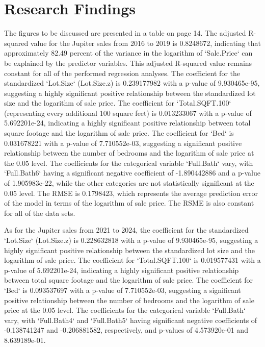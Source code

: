 \documentclass[12pt,english]{article}
\begin{document}
\section{Research Findings}\label{sec:results}
The figures to be discussed are presented in a table on page 14. The adjusted R-squared value for the Jupiter sales from 2016 to 2019 is 0.8248672, indicating that approximately 82.49 percent of the variance in the logarithm of `Sale.Price` can be explained by the predictor variables. This adjusted R-squared value remains constant for all of the performed regression analyses. The coefficient for the standardized `Lot.Size` (Lot.Size.z) is 0.239177982 with a p-value of 9.930465e-95, suggesting a highly significant positive relationship between the standardized lot size and the logarithm of sale price. The coefficient for `Total.SQFT.100` (representing every additional 100 square feet) is 0.013233067 with a p-value of 5.692201e-24, indicating a highly significant positive relationship between total square footage and the logarithm of sale price. The coefficient for `Bed` is 0.031678221 with a p-value of 7.710552e-03, suggesting a significant positive relationship between the number of bedrooms and the logarithm of sale price at the 0.05 level. The coefficients for the categorical variable `Full.Bath` vary, with `Full.Bath6` having a significant negative coefficient of -1.890442886 and a p-value of 1.905983e-22, while the other categories are not statistically significant at the 0.05 level. The RMSE is 0.1798423, which represents the average prediction error of the model in terms of the logarithm of sale price. The RSME is also constant for all of the data sets. 

As for the Jupiter sales from 2021 to 2024, the coefficient for the standardized `Lot.Size` (Lot.Size.z) is 0.228632818 with a p-value of 9.930465e-95, suggesting a highly significant positive relationship between the standardized lot size and the logarithm of sale price. The coefficient for `Total.SQFT.100` is 0.019577431 with a p-value of 5.692201e-24, indicating a highly significant positive relationship between total square footage and the logarithm of sale price. The coefficient for `Bed` is 0.093537697 with a p-value of 7.710552e-03, suggesting a significant positive relationship between the number of bedrooms and the logarithm of sale price at the 0.05 level. The coefficients for the categorical variable `Full.Bath` vary, with `Full.Bath4` and `Full.Bath5` having significant negative coefficients of -0.138741247 and -0.206881582, respectively, and p-values of 4.573920e-01 and 8.639189e-01. 
\end{document}
